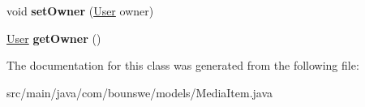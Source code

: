 \begin{DoxyCompactItemize}
\item 
\mbox{\label{classcom_1_1bounswe_1_1models_1_1_media_item_ac11c651372b6bfa8aea498434a774955}} 
void {\bfseries set\+Owner} (\hyperlink{classcom_1_1bounswe_1_1models_1_1_user}{User} owner)
\item 
\mbox{\label{classcom_1_1bounswe_1_1models_1_1_media_item_a0ba8c30c2c1698b2ae8452dee276ec9d}} 
\hyperlink{classcom_1_1bounswe_1_1models_1_1_user}{User} {\bfseries get\+Owner} ()
\end{DoxyCompactItemize}


The documentation for this class was generated from the following file\+:\begin{DoxyCompactItemize}
\item 
src/main/java/com/bounswe/models/Media\+Item.\+java\end{DoxyCompactItemize}
